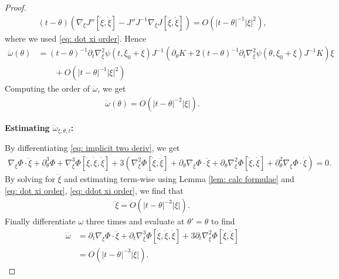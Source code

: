 \documentclass[12pt]{amsart}
\numberwithin{equation}{section}
\newcommand{\1}{\mathbbm{1}}
\newcommand{\xixi}{\xi_0 + \xi}
\begin{document}
\begin{proof}
    \begin{align}
        (t-\theta) (\nabla_\xi J''[\dot \xi, \dot \xi]- J'' J^{-1} \nabla_\xi J[\dot \xi, \dot \xi]) = O(|t-\theta|^{-1} |\xi|^2),
    \end{align}
    where we used \eqref{eq: dot xi order}. Hence 
    \begin{align}
        \ddot \omega(\theta) &= (t - \theta)^{-1} \partial_t \nabla_\xi^2 \psi(t, \xixi) J^{-1}(\partial_\theta K + 2(t - \theta)^{-1} \partial_t \nabla_\xi^2 \psi(\theta, \xixi) J^{-1} K)\xi \\& \qquad+ O(|t - \theta|^{-1} |\xi|^2) 
    \end{align}
    Computing the order of $\ddot \omega$, we get 
    \begin{align}
        \ddot \omega(\theta) = O(|t-\theta|^{-2} |\xi|). 
    \end{align}

    \noindent \textbf{Estimating $\dddot \omega_{\xi, \theta, t}$:}
    
    By differentiating \eqref{eq: implicit two deriv}, we get 
    \begin{align}
        \nabla_\xi \Phi \cdot \dddot \xi + \partial_\theta^3 \Phi + \nabla_\xi^3 \Phi[\dot \xi, \dot \xi, \dot \xi] + 3(\nabla_\xi^2 \Phi[\dot \xi,\ddot \xi] + \partial_\theta \nabla_\xi \Phi \cdot \ddot \xi + \partial_\theta \nabla_\xi^2 \Phi[\dot \xi, \dot \xi] + \partial_\theta^2 \nabla_\xi \Phi \cdot \dot \xi) = 0.
    \end{align}
    By solving for $\dddot \xi$ and estimating term-wise using Lemma \ref{lem: calc formulae} and \eqref{eq: dot xi order}, \eqref{eq: ddot xi order}, we find that 
    \begin{align}
        \dddot \xi = O(|t - \theta|^{-3} |\xi|). 
    \end{align}
    Finally differentiate $\omega$ three times and evaluate at $\theta' = \theta$ to find 
    \begin{align}
        \dddot \omega &= \partial_t \nabla_\xi \Phi \cdot \dddot\xi + \partial_t \nabla_\xi^3 \Phi[\dot \xi, \dot \xi, \dot \xi] + 3 \partial_t \nabla_\xi^2 \Phi[\dot \xi, \ddot \xi] \\
        &= O(|t -\theta|^{-3} |\xi|). 
    \end{align}
\end{proof}
\end{document}
